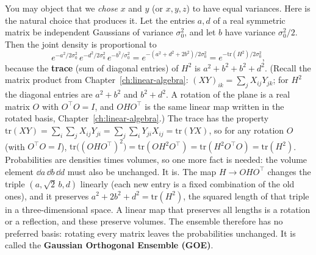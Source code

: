 You may object that we \emph{chose} $x$ and $y$ (or $x,y,z$) to have equal variances. Here is the natural choice that produces it. Let the entries $a,d$ of a real symmetric matrix be independent Gaussians of variance $\sigma_0^2$, and let $b$ have variance $\sigma_0^2/2$. Then the joint density is proportional to
\begin{equation}
e^{-a^2/2\sigma_0^2}\,e^{-d^2/2\sigma_0^2}\,e^{-b^2/\sigma_0^2}=e^{-(a^2+d^2+2b^2)/2\sigma_0^2}=e^{-\mathrm{tr}(H^2)/2\sigma_0^2},
\end{equation}
because the \textbf{trace} (sum of diagonal entries) of $H^2$ is $a^2+b^2+b^2+d^2$. (Recall the matrix product from Chapter~\ref{ch:linear-algebra}: $(XY)_{ik}=\sum_jX_{ij}Y_{jk}$; for $H^2$ the diagonal entries are $a^2+b^2$ and $b^2+d^2$. A rotation of the plane is a real matrix $O$ with $O^\top O=I$, and $OHO^\top$ is the same linear map written in the rotated basis, Chapter~\ref{ch:linear-algebra}.) The trace has the property $\mathrm{tr}(XY)=\sum_i\sum_jX_{ij}Y_{ji}=\sum_j\sum_iY_{ji}X_{ij}=\mathrm{tr}(YX)$, so for any rotation $O$ (with $O^\top O=I$), $\mathrm{tr}\big((OHO^\top)^2\big)=\mathrm{tr}(OH^2O^\top)=\mathrm{tr}(H^2O^\top O)=\mathrm{tr}(H^2)$. Probabilities are densities times volumes, so one more fact is needed: the volume element $\dd a\,\dd b\,\dd d$ must also be unchanged. It is. The map $H\to OHO^\top$ changes the triple $(a,\sqrt2\,b,d)$ linearly (each new entry is a fixed combination of the old ones), and it preserves $a^2+2b^2+d^2=\mathrm{tr}(H^2)$, the squared length of that triple in a three-dimensional space. A linear map that preserves all lengths is a rotation or a reflection, and these preserve volumes. The ensemble therefore has no preferred basis: rotating every matrix leaves the probabilities unchanged. It is called the \textbf{Gaussian Orthogonal Ensemble (GOE)}.

